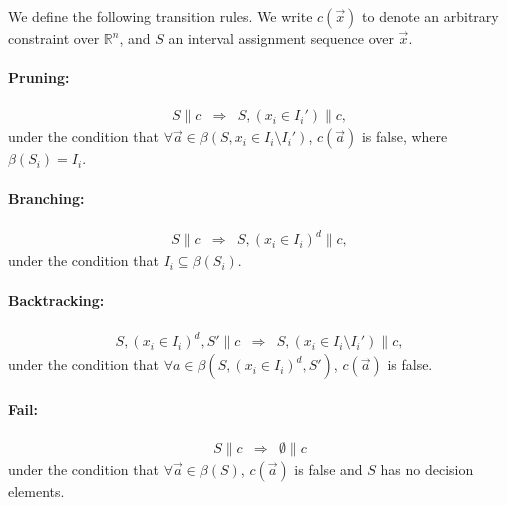 \documentclass[envcountsect]{llncs}
\begin{document}
\begin{definition} We define the following transition rules.
We write $c(\vec x)$ to denote an arbitrary constraint over $\mathbb{R}^n$, and
$S$ an interval assignment sequence over $\vec x$.

\paragraph{Pruning:}
\begin{eqnarray*}
S\parallel c &\Longrightarrow& S, (x_i\in I_i')\parallel c,
\end{eqnarray*}
under the condition that $\forall \vec a\in \beta(S,x_i\in
I_i\setminus I_i')$,
$c(\vec a)$ is false, where $\beta(S_i) = I_i$.
\paragraph{Branching:}
\begin{eqnarray*}
S\parallel c &\Longrightarrow& S, (x_i\in I_i)^d \parallel c,
\end{eqnarray*}
under the condition that $I_i\subseteq \beta(S_i)$.

\paragraph{Backtracking:}
\begin{eqnarray*}
S, (x_i\in I_i)^d, S'\parallel c &\Longrightarrow& S, (x_i\in
I_i\setminus I_i') \parallel c,
\end{eqnarray*}
under the condition that $\forall a\in \beta(S, (x_i\in I_i)^d, S')$, $c(\vec
a)$
is false.

\paragraph{Fail:}
\begin{eqnarray*}
S\parallel c &\Longrightarrow& \emptyset \parallel c
\end{eqnarray*}
under the condition that $\forall \vec a\in \beta(S)$, $c(\vec a)$ is false and
 $S$ has no decision elements.
\end{definition}
\end{document}
